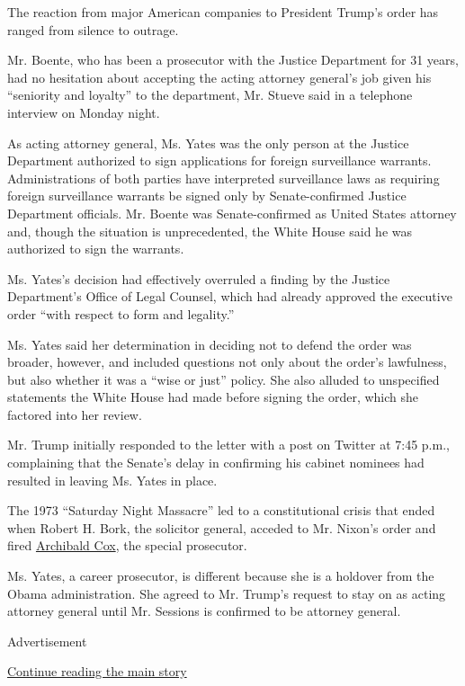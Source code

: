 The reaction from major American companies to President Trump's order
has ranged from silence to outrage.

Mr. Boente, who has been a prosecutor with the Justice Department for 31
years, had no hesitation about accepting the acting attorney general's
job given his ``seniority and loyalty'' to the department, Mr. Stueve
said in a telephone interview on Monday night.

As acting attorney general, Ms. Yates was the only person at the Justice
Department authorized to sign applications for foreign surveillance
warrants. Administrations of both parties have interpreted surveillance
laws as requiring foreign surveillance warrants be signed only by
Senate-confirmed Justice Department officials. Mr. Boente was
Senate-confirmed as United States attorney and, though the situation is
unprecedented, the White House said he was authorized to sign the
warrants.

Ms. Yates's decision had effectively overruled a finding by the Justice
Department's Office of Legal Counsel, which had already approved the
executive order ``with respect to form and legality.''

Ms. Yates said her determination in deciding not to defend the order was
broader, however, and included questions not only about the order's
lawfulness, but also whether it was a ``wise or just'' policy. She also
alluded to unspecified statements the White House had made before
signing the order, which she factored into her review.

Mr. Trump initially responded to the letter with a post on Twitter at
7:45 p.m., complaining that the Senate's delay in confirming his cabinet
nominees had resulted in leaving Ms. Yates in place.

The 1973 ``Saturday Night Massacre'' led to a constitutional crisis that
ended when Robert H. Bork, the solicitor general, acceded to Mr. Nixon's
order and fired
\href{http://www.nytimes.com/2004/05/30/nyregion/archibald-cox-92-is-dead-helped-prosecute-watergate.html}{Archibald
Cox}, the special prosecutor.

Ms. Yates, a career prosecutor, is different because she is a holdover
from the Obama administration. She agreed to Mr. Trump's request to stay
on as acting attorney general until Mr. Sessions is confirmed to be
attorney general.

Advertisement

\protect\hyperlink{after-bottom}{Continue reading the main story}

